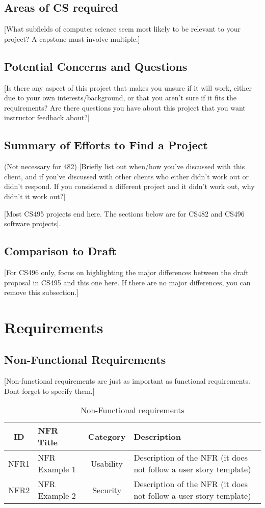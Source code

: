 \documentclass{article}
\begin{document}
\subsection{Areas of CS required}
[What subfields of computer science seem most likely to be relevant to your project? A capstone must involve multiple.]

\subsection{Potential Concerns and Questions}
[Is there any aspect of this project that makes you unsure if it will work, either due to your own interests/background, or that you aren't sure if it fits the requirements? Are there questions you have about this project that you want instructor feedback about?]

\subsection{Summary of Efforts to Find a Project}
(Not necessary for 482) [Briefly list out when/how you've discussed with this client, and if you've discussed with other clients who either didn't work out or didn't respond. If you considered a different project and it didn't work out, why didn't it work out?] 

[Most CS495 projects end here. The sections below are for CS482 and CS496 software projects].

\subsection{Comparison to Draft}
[For CS496 only, focus on highlighting the major differences between the draft proposal in CS495 and this one here. If there are no major differences, you can remove this subsection.]

\section{Requirements}

\subsection{Non-Functional Requirements}
[Non-functional requirements are just as important as functional requirements. Dont forget to specify them.]

\begin{table}[h!]
\centering
\begin{tabular}{c l c p{9cm}}
\hline
\textbf{ID} & \textbf{NFR Title} & \textbf{Category} & \textbf{Description} \\
\hline
NFR1 & NFR Example 1 & Usability & Description of the NFR (it does not follow a user story template) \\ \hline
NFR2 & NFR Example 2 & Security & Description of the NFR (it does not follow a user story template) \\ \hline
\end{tabular}
\caption{Non-Functional requirements}
\end{table}
\end{document}
